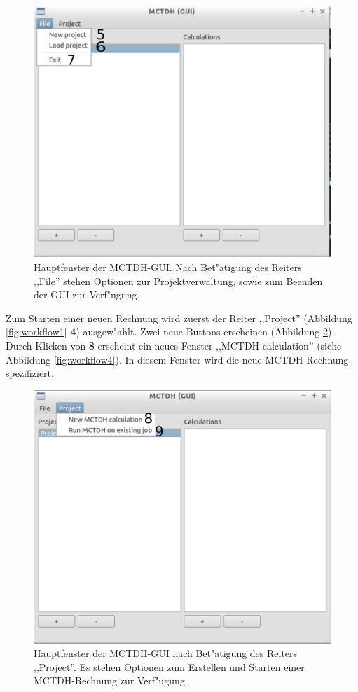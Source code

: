 \begin{figure}
    \centering
    \includegraphics[scale=0.5]{figures/screenMainFile}
    \caption{Hauptfenster der MCTDH-GUI. Nach Bet"atigung des Reiters ,,File''
		stehen Optionen zur Projektverwaltung, sowie zum Beenden der GUI zur Verf"ugung.}\label{fig:workflow2}
\end{figure}

Zum Starten einer neuen Rechnung wird zuerst der Reiter ,,Project'' (Abbildung \ref{fig:workflow1} \textbf{4}) 
ausgew"ahlt. Zwei neue Buttons erscheinen (Abbildung \ref{fig:workflow3}). Durch Klicken von \textbf{8} 
erscheint ein neues Fenster ,,MCTDH calculation'' (siehe Abbildung \ref{fig:workflow4}). 
In diesem Fenster wird die neue MCTDH Rechnung spezifiziert.

\begin{figure}
    \centering
    \includegraphics[scale=0.5]{figures/screenMainProject}
    \caption{Hauptfenster der MCTDH-GUI nach Bet"atigung des Reiters ,,Project''. Es stehen Optionen zum Erstellen und Starten einer
    MCTDH-Rechnung zur Verf"ugung.}\label{fig:workflow3}
\end{figure}

